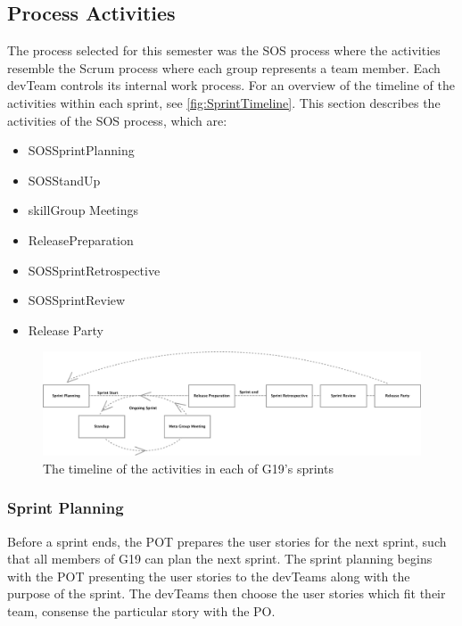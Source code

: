 \subsection{Process Activities}

The process selected for this semester was the \gls{SOS} process where the activities resemble the Scrum process where each group represents a team member.  Each \gls{devTeam} controls its internal work process. For an overview of the timeline of the activities within each sprint, see \autoref{fig:SprintTimeline}. This section describes the activities of the \gls{SOS} process, which are:

\begin{itemize}
    \item \Gls{SOSSprintPlanning}
    \item \Gls{SOSStandUp}
    \item \Gls{skillGroup} Meetings
    \item \Gls{ReleasePreparation}
    \item \Gls{SOSSprintRetrospective}
    \item \Gls{SOSSprintReview}
    \item Release Party
\end{itemize}

\begin{figure}[H]
        \begin{center}
            \includegraphics[width=1\textwidth]{figures/Process_overview.pdf}
        \end{center}
        \caption{The timeline of the activities in each of \gls{G19}'s sprints}
        \label{fig:SprintTimeline}
\end{figure}

\subsubsection{Sprint Planning}

Before a sprint ends, the \gls{POT} prepares the user stories for the next sprint, such that all members of \gls{G19} can plan the next sprint. The sprint planning begins with the \gls{POT} presenting the user stories to the \glspl{devTeam} along with the purpose of the sprint. The \glspl{devTeam} then choose the user stories which fit their team, consense the particular story with the \gls{PO}.

